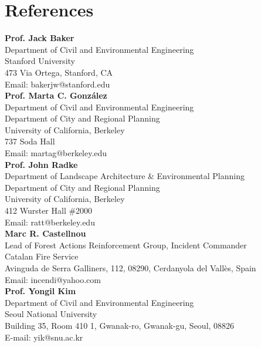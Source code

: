 \section*{References}
\begin{cvcontent}

\noindent\textbf{\small Prof. Jack Baker}\\
    Department of Civil and Environmental Engineering\\
    Stanford University\\
    473 Via Ortega, Stanford, CA\\
    Email: bakerjw@stanford.edu\\
    
\noindent\textbf{\small Prof. Marta C. Gonz\'{a}lez}\\
    Department of Civil and Environmental Engineering\\
    Department of City and Regional Planning\\
    University of California, Berkeley\\
    737 Soda Hall\\
    Email: martag@berkeley.edu\\
    
\noindent\textbf{\small Prof. John Radke}\\
    Department of Landscape Architecture \& Environmental Planning \\
    Department of City and Regional Planning \\
    University of California, Berkeley \\
    412 Wurster Hall \#2000 \\
    Email: ratt@berkeley.edu \\

\noindent\textbf{\small Marc R. Castellnou}\\
    Lead of Forest Actions Reinforcement Group, Incident Commander \\
    Catalan Fire Service \\
    Avinguda de Serra Galliners, 112, 08290, Cerdanyola del Vallès, Spain \\
    Email: incendi@yahoo.com \\

    
\noindent\textbf{\small Prof. Yongil Kim}\\
    Department of Civil and Environmental Engineering\\
    Seoul National University\\
    Building 35, Room 410 1, Gwanak-ro, Gwanak-gu, Seoul, 08826 \\
    E-mail: yik@snu.ac.kr \\


\end{cvcontent}